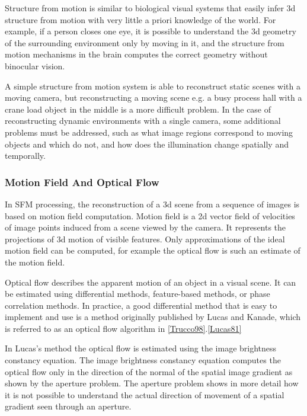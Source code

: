 \documentclass[12pt,a4paper,oneside,pdftex]{report}
\begin{document}
{Structure from motion is similar to biological visual systems that easily infer 3d structure from motion with very little a priori knowledge of the world. For example, if a person closes one eye, it is possible to understand the 3d geometry of the surrounding environment only by moving in it, and the structure from motion mechanisms in the brain computes the correct geometry without binocular vision.

A simple structure from motion system is able to reconstruct static scenes with a moving camera, but reconstructing a moving scene e.g. a busy process hall with a crane load object in the middle is a more difficult problem. In the case of reconstructing dynamic environments with a single camera, some additional problems must be addressed, such as what image regions correspond to moving objects and which do not, and how does the illumination change spatially and temporally.

\subsubsection{Motion Field And Optical Flow}
\label{subsubsection:motion_field_and_optical_flow}

In SFM processing, the reconstruction of a 3d scene from a sequence of images is based on motion field computation. Motion field is a 2d vector field of velocities of image points induced from a scene viewed by the camera. It represents the projections of 3d motion of visible features. Only approximations of the ideal motion field can be computed, for example the optical flow is such an estimate of the motion field.

Optical flow describes the apparent motion of an object in a visual scene. It can be estimated using differential methods, feature-based methods, or phase correlation methods. In practice, a good differential method that is easy to implement and use is a method originally published by Lucas and Kanade, which is referred to as an optical flow algorithm in \ref{Trucco98}.\ref{Lucas81}

In Lucas's method the optical flow is estimated using the image brightness constancy equation. The image brightness constancy equation computes the optical flow only in the direction of the normal of the spatial image gradient as shown by the aperture problem. The aperture problem shows in more detail how it is not possible to understand the actual direction of movement of a spatial gradient seen through an aperture.  

}
\end{document}
